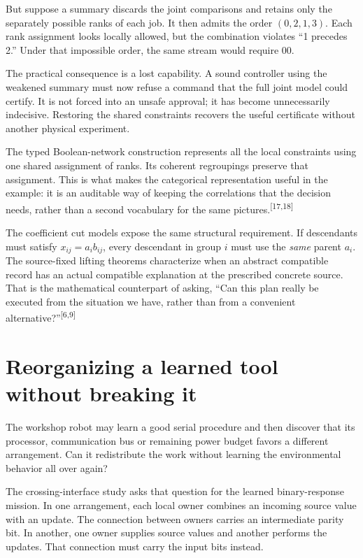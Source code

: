 \documentclass[11pt]{article}
\newcommand{\sn}[1]{\textsuperscript{[#1]}}
\begin{document}
But suppose a summary discards the joint comparisons and retains only the separately possible ranks of each job. It then admits the order $(0,2,1,3)$. Each rank assignment looks locally allowed, but the combination violates ``1 precedes 2.'' Under that impossible order, the same stream would require $00$.

The practical consequence is a lost capability. A sound controller using the weakened summary must now refuse a command that the full joint model could certify. It is not forced into an unsafe approval; it has become unnecessarily indecisive. Restoring the shared constraints recovers the useful certificate without another physical experiment.

The typed Boolean-network construction represents all the local constraints using one shared assignment of ranks. Its coherent regroupings preserve that assignment. This is what makes the categorical representation useful in the example: it is an auditable way of keeping the correlations that the decision needs, rather than a second vocabulary for the same pictures.\sn{17,18}

The coefficient cut models expose the same structural requirement. If descendants must satisfy $x_{ij}=a_i b_{ij}$, every descendant in group $i$ must use the \emph{same} parent $a_i$. The source-fixed lifting theorems characterize when an abstract compatible record has an actual compatible explanation at the prescribed concrete source. That is the mathematical counterpart of asking, ``Can this plan really be executed from the situation we have, rather than from a convenient alternative?''\sn{6,9}

\section{Reorganizing a learned tool without breaking it}

The workshop robot may learn a good serial procedure and then discover that its processor, communication bus or remaining power budget favors a different arrangement. Can it redistribute the work without learning the environmental behavior all over again?

The crossing-interface study asks that question for the learned binary-response mission. In one arrangement, each local owner combines an incoming source value with an update. The connection between owners carries an intermediate parity bit. In another, one owner supplies source values and another performs the updates. That connection must carry the input bits instead.
\end{document}
